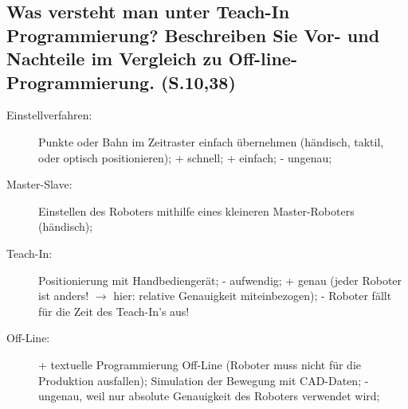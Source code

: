 \subsection{ Was versteht man unter Teach-In Programmierung? Beschreiben Sie Vor- und Nachteile im Vergleich zu Off-line-Programmierung. (S.10,38)}
\begin{description}
\item[Einstellverfahren:] Punkte oder Bahn im Zeitraster einfach übernehmen (händisch, taktil,
  oder optisch positionieren); + schnell; + einfach; - ungenau;
\item[Master-Slave:] Einstellen des Roboters mithilfe eines kleineren Master-Roboters 
  (händisch); 
\item[Teach-In:] Positionierung mit Handbediengerät; 
  - aufwendig; + genau (jeder Roboter ist anders! $\rightarrow$ hier: relative
  Genauigkeit miteinbezogen); - Roboter fällt für die Zeit des Teach-In's aus!
\item[Off-Line:] + textuelle Programmierung Off-Line (Roboter muss nicht für die Produktion 
  ausfallen); Simulation der Bewegung mit CAD-Daten; - ungenau, weil nur absolute Genauigkeit 
  des Roboters verwendet wird;
\end{description}
